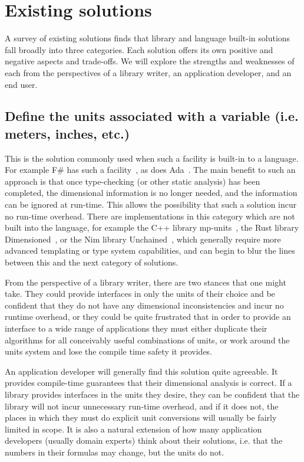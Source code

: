 \documentclass{article}
\begin{document}
\section{Existing solutions}
\label{ExistingSolutions}

A survey of existing solutions finds that library and language built-in solutions fall broadly into three categories.
Each solution offers its own positive and negative aspects and trade-offs.
We will explore the strengths and weaknesses of each from the perspectives of a library writer, an application developer, and an end user.

\subsection{Define the units associated with a variable (i.e. meters, inches, etc.)}
\label{static-units}

This is the solution commonly used when such a facility is built-in to a language.
For example F\# has such a facility~\cite{FSharpUnitsofMeasure2020}, as does Ada~\cite{DimensionalityCheckingAda}.
The main benefit to such an approach is that once type-checking (or other static analysis) has been completed,
the dimensional information is no longer needed, and the information can be ignored at run-time.
This allows the possibility that such a solution incur no run-time overhead.
There are implementations in this category which are not built into the language,
for example the C++ library mp-units~\cite{mpunits}, the Rust library Dimensioned~\cite{RustDimensioned}, or the Nim library Unchained~\cite{SciNimUnchained},
which generally require more advanced templating or type system capabilities,
and can begin to blur the lines between this and the next category of solutions.

From the perspective of a library writer, there are two stances that one might take.
They could provide interfaces in only the units of their choice and be confident that they do not have any dimensional inconsistencies and incur no runtime overhead,
or they could be quite frustrated that in order to provide an interface to a wide range of applications they must either duplicate their algorithms for all conceivably useful combinations of units, or work around the units system and lose the compile time safety it provides.

An application developer will generally find this solution quite agreeable.
It provides compile-time guarantees that their dimensional analysis is correct.
If a library provides interfaces in the units they desire, they can be confident that the library will not incur unnecessary run-time overhead,
and if it does not, the places in which they must do explicit unit conversions will usually be fairly limited in scope.
It is also a natural extension of how many application developers (usually domain experts) think about their solutions,
i.e. that the numbers in their formulas may change, but the units do not.
\end{document}
